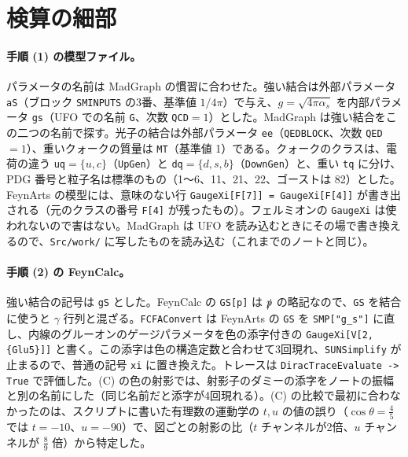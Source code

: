 \documentclass[a4paper,10pt]{ltjsarticle}
\begin{document}
\section{検算の細部}\label{app:details}

\paragraph{手順 (1) の模型ファイル。}パラメータの名前は MadGraph の慣習に合わせた。強い結合は外部パラメータ \texttt{aS}（ブロック \texttt{SMINPUTS} の3番、基準値 $1/4\pi$）で与え、$g=\sqrt{4\pi\alpha_s}$ を内部パラメータ \texttt{gs}（UFO での名前 \texttt{G}、次数 \texttt{QCD}$=1$）とした。MadGraph は強い結合をこの二つの名前で探す。光子の結合は外部パラメータ \texttt{ee}（\texttt{QEDBLOCK}、次数 \texttt{QED}$=1$）、重いクォークの質量は \texttt{MT}（基準値 1）である。クォークのクラスは、電荷の違う \texttt{uq}$=\{u,c\}$（\texttt{UpGen}）と \texttt{dq}$=\{d,s,b\}$（\texttt{DownGen}）と、重い \texttt{tq} に分け、PDG 番号と粒子名は標準のもの（1〜6、11、21、22、ゴーストは 82）とした。FeynArts の模型には、意味のない行 \texttt{GaugeXi[F[7]] = GaugeXi[F[4]]} が書き出される（元のクラスの番号 \texttt{F[4]} が残ったもの）。フェルミオンの \texttt{GaugeXi} は使われないので害はない。MadGraph は UFO を読み込むときにその場で書き換えるので、\texttt{Src/work/} に写したものを読み込む（これまでのノートと同じ）。

\paragraph{手順 (2) の FeynCalc。}強い結合の記号は \texttt{gS} とした。FeynCalc の \texttt{GS[p]} は $\slashed p$ の略記なので、\texttt{GS} を結合に使うと $\gamma$ 行列と混ざる。\texttt{FCFAConvert} は FeynArts の \texttt{GS} を \texttt{SMP["g\_s"]} に直し、内線のグルーオンのゲージパラメータを色の添字付きの \texttt{GaugeXi[V[2, \{Glu5\}]]} と書く。この添字は色の構造定数と合わせて3回現れ、\texttt{SUNSimplify} が止まるので、普通の記号 \texttt{xi} に置き換えた。トレースは \texttt{DiracTraceEvaluate -> True} で評価した。(C) の色の射影では、射影子のダミーの添字をノートの振幅と別の名前にした（同じ名前だと添字が4回現れる）。(C) の比較で最初に合わなかったのは、スクリプトに書いた有理数の運動学の $t,u$ の値の誤り（$\cos\theta=\frac45$ では $t=-10$、$u=-90$）で、図ごとの射影の比（$t$ チャンネルが2倍、$u$ チャンネルが $\frac89$ 倍）から特定した。
\end{document}
